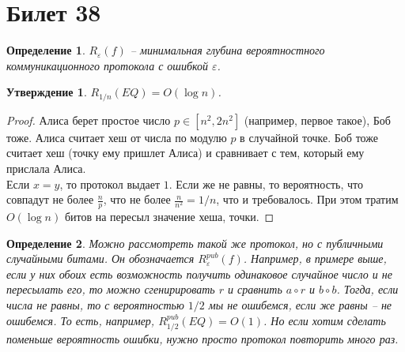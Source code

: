 \documentclass[12pt, letterpaper]{article}
\newtheorem{prop}{Утверждение}[section]
\newtheorem{defi}{Определение}[section]
\newcommand{\e}{\varepsilon}
\begin{document}
\section{Билет 38}
\begin{defi}
$R_{\e}(f)$ -- минимальная глубина вероятностного коммуникационного протокола с ошибкой $\e$. 
\end{defi}
\begin{prop}
$R_{1/n}(EQ) = O(\log n)$.
\end{prop}
\begin{proof}
Алиса берет простое число $p \in [n^2, 2n^2]$ (например, первое такое), Боб тоже. Алиса считает хеш от числа по модулю $p$ в случайной точке. Боб тоже считает хеш (точку ему пришлет Алиса) и сравнивает с тем, который ему прислала Алиса.\\
Если $x=y$, то протокол выдает $1$. Если же не равны, то вероятность, что совпадут не более $\frac{n}{p}$, что не более $\frac{n}{n^2} = 1/n$, что и требовалось. При этом тратим $O(\log n)$ битов на пересыл значение хеша, точки. 
\end{proof}
\begin{defi}
Можно рассмотреть такой же протокол, но с публичными случайными битами. Он обозначается $R^{pub}_\e(f)$. Например, в примере выше, если у них обоих есть возможность получить одинаковое случайное число и не пересылать его, то можно сгенирировать $r$ и сравнить $a \circ r$ и $b \circ b$. Тогда, если числа не равны, то с вероятностью $1/2$ мы не ошибемся, если же равны -- не ошибемся. То есть, например, $R^{pub}_{1/2}(EQ) = O(1)$. Но если хотим сделать поменьше вероятность ошибки, нужно просто протокол повторить много раз.
\end{defi}
\end{document}
